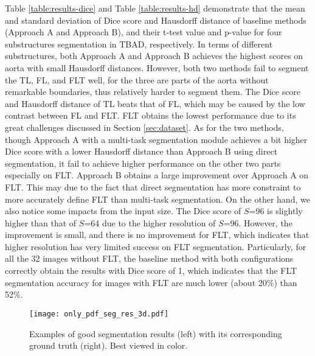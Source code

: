 \documentclass{article}
\begin{document}
Table \ref{table:results-dice}  and Table \ref{table:results-hd} demonstrate that the mean and standard deviation of Dice score and Hausdorff distance of baseline methods (Approach A and Approach B), and their t-test value and p-value for four substructures segmentation in TBAD, respectively.
% 
% 
In terms of different substructures, both Approach A and Approach B achieves the highest scores on aorta with small Hausdorff distances.
% 
However, both two methods fail to segment the TL, FL, and FLT well,  for the three are parts of the aorta without remarkable boundaries, thus relatively harder to segment them.
% 
The Dice score and Hausdorff distance of TL beats that of FL, which may be caused by the low contrast between FL and FLT.
% 
FLT obtains the lowest performance due to its great challenges discussed in Section \ref{sec:dataset}.
% 
% 
As for the two methods, though Approach A with a multi-task segmentation module achieves a bit higher Dice score with a lower Hausdorff distance than Approach B using direct segmentation, it fail to achieve higher performance on the other two parts especially on FLT.
% 
Approach B obtains a large improvement over Approach A on FLT. This may due to the fact that direct segmentation has more constraint to more accurately define FLT than multi-task segmentation.
% 
% 
On the other hand, we also notice some impacts from the input size.
% 
The Dice score of $S$=96 is slightly higher than that of $S$=64 due to the higher resolution of $S$=96.
% 
However, the improvement is small, and there is no improvement for FLT, which indicates that higher resolution has very limited success on FLT segmentation.
% 
Particularly, for all the 32 images without FLT, the baseline method with both configurations correctly obtain the results with Dice score of 1, which indicates that the FLT segmentation accuracy for images with FLT are much lower (about 20\%) than 52\%.


\begin{figure}[!t]
\centering
\texttt{[image: only\_pdf\_seg\_res\_3d.pdf]}
\caption{
Examples of good segmentation results (left) with its corresponding ground truth (right).
Best viewed in color.
%
}
\label{fig:good_seg}
\end{figure}
\end{document}
